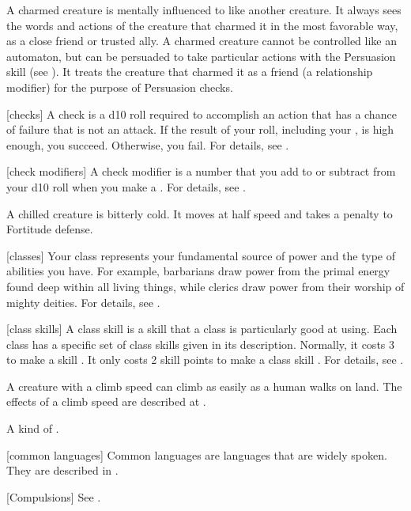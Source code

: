  A charmed creature is mentally influenced to like another creature.
It always sees the words and actions of the creature that charmed it in the most favorable way, as a close friend or trusted ally.
A charmed creature cannot be controlled like an automaton, but can be persuaded to take particular actions with the Persuasion skill (see ).
It treats the creature that charmed it as a friend (a  relationship modifier) for the purpose of Persuasion checks.

[checks] A check is a d10 roll required to accomplish an action that has a chance of failure that is not an attack.
If the result of your roll, including your , is high enough, you succeed.
Otherwise, you fail.
For details, see .

[check modifiers] A check modifier is a number that you add to or subtract from your d10 roll when you make a .
For details, see .

 A chilled creature is bitterly cold.
It moves at half speed and takes a  penalty to Fortitude defense.

[classes] Your class represents your fundamental source of power and the type of abilities you have.
For example, barbarians draw power from the primal energy found deep within all living things, while clerics draw power from their worship of mighty deities.
For details, see .

[class skills] A class skill is a skill that a class is particularly good at using.
Each class has a specific set of class skills given in its description.
Normally, it costs 3  to make a skill .
It only costs 2 skill points to make a class skill .
For details, see .

 A creature with a climb speed can climb as easily as a human walks on land.
The effects of a climb speed are described at .

 A kind of .

[common languages] Common languages are languages that are widely spoken.
They are described in .

[Compulsions] See .

